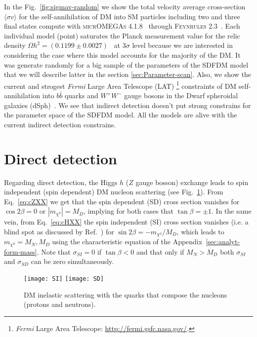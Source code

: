 In the Fig.~\ref{fig:sigmav-random} we show the total velocity average cross-section $\langle\sigma v\rangle$ for the self-annihilation of DM into SM particles including two and three final states compute with \textsc{micrOMEGAs 4.1.8}~\cite{Belanger:2014vza} through \textsc{Feynrules 2.3}~\cite{Christensen:2008py}. Each individual model (point) saturates the Planck measurement value for the relic density $\Omega h^2=(0.1199\pm0.0027)$~\cite{Ade:2013zuv} at $3\sigma$ level because we are interested in considering the case where this model accounts for the majority of the DM. It was generate randomly for a big sample of the parameters of the SDFDM model that we will describe latter in the section \ref{sec:Parameter-scan}. Also, we show the current and strogest \textit{Fermi}  Large Area Telescope (LAT) \footnote{\textit{Fermi}  Large Area Telescope: \url{http://fermi.gsfc.nasa.gov/}.} constraints of DM self-annihilation into $b\bar{b}$ quarks and $W^+W^-$ gauge bosons in the Dwarf spheroidal galaxies (dSph)~\cite{Ackermann:2015zua}. We see that indirect detection doesn't put strong constrains for the parameter space of the SDFDM model. All the models are alive with the current indirect detection constrains.    



\section{Direct detection}
Regarding direct detection, the Higgs $h$ ($Z$ gauge bosson) exchange leads to spin independent (spin dependent) DM nucleon scattering (see Fig.~\ref{fig:SD_SI}). From Eq.~\eqref{eq:cZXX} we get that the spin dependent (SD) cross section vanishes for $\cos2\beta=0$ or $|m_{\chi^0}|=M_D$, implying for both cases that $\tan\beta=\pm1$. In the same vein, from Eq.~\eqref{eq:cHXX} the spin independent (SI) cross section vanishes (i.e. a blind spot as discussed by Ref.~\cite{Cheung:2013dua}) for $\sin2\beta=-m_{\chi^0}/M_D$, which leads to $m_{\chi^0}=M_N, M_D$ using the characteristic equation of the Appendix~\eqref{sec:analyt-form-mass}. Note that $\sigma_{SI}=0$ if $\tan\beta<0$ and that only if $M_N>M_D$ both $\sigma_{SI}$ and $\sigma_{SD}$ can be zero simultaneously. 
%
\begin{figure}[h]
  \centering
  \texttt{[image: SI]} \texttt{[image: SD]}
  \caption{DM inelastic scattering with the quarks that compose the nucleons (protons and neutrons).}
  \label{fig:SD_SI}
\end{figure}





